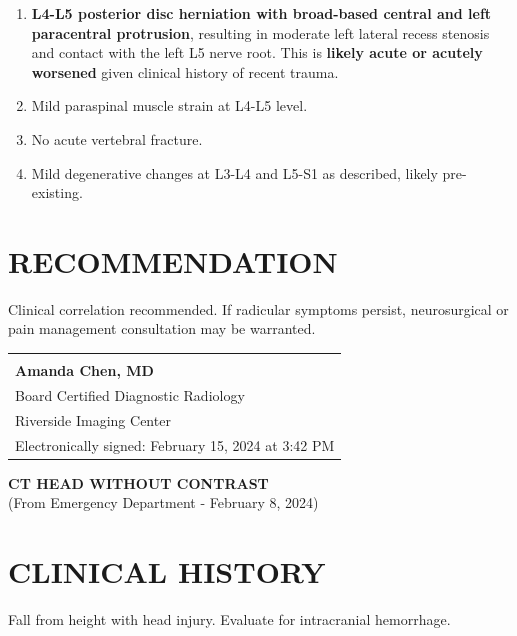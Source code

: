\documentclass[11pt]{article}
\begin{document}
\begin{enumerate}
\item \textbf{L4-L5 posterior disc herniation with broad-based central and left paracentral protrusion}, resulting in moderate left lateral recess stenosis and contact with the left L5 nerve root. This is \textbf{likely acute or acutely worsened} given clinical history of recent trauma.

\item Mild paraspinal muscle strain at L4-L5 level.

\item No acute vertebral fracture.

\item Mild degenerative changes at L3-L4 and L5-S1 as described, likely pre-existing.
\end{enumerate}

\section*{RECOMMENDATION}

Clinical correlation recommended. If radicular symptoms persist, neurosurgical or pain management consultation may be warranted.

\vspace{2em}

\begin{tabular}{@{}p{10cm}@{}}
\hrulefill \\
\textbf{Amanda Chen, MD} \\
Board Certified Diagnostic Radiology \\
Riverside Imaging Center \\
Electronically signed: February 15, 2024 at 3:42 PM \\
\end{tabular}

\newpage

\begin{center}
{\Large\bfseries CT HEAD WITHOUT CONTRAST}\\
{\normalsize (From Emergency Department - February 8, 2024)}
\end{center}

\vspace{1em}

\section*{CLINICAL HISTORY}

Fall from height with head injury. Evaluate for intracranial hemorrhage.
\end{document}
